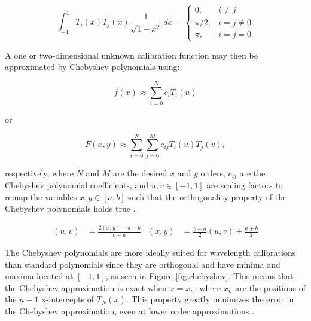 \begin{equation}
    \int_{-1}^{1} T_{i}(x) T_{j}(x) \frac{1}{\sqrt{1-x^{2}}} \,dx =
    \begin{cases}
        0,       & i \neq j     \\
        \pi / 2, & i = j \neq 0 \\
        \pi,     & i = j = 0
    \end{cases}
    \label{eq:chebyorth}
\end{equation}

A one or two-dimensional unknown calibration function may then be approximated by Chebyshev polynomials using:

\begin{equation}
    f(x) \approx \sum_{i = 0}^{N}  c_{i} T_{i}(u)
    \label{eq:chebyshev}
\end{equation}

\noindent or

\begin{equation}
    F(x, y) \approx \sum_{i = 0}^{N} \sum_{j = 0}^{M} c_{ij} T_{i}(u) T_{j}(v),
    \label{eq:chebyshev2D}
\end{equation}

\noindent respectively, where $N$ and $M$ are the desired $x$ and $y$ orders, $c_{ij}$ are the Chebyshev polynomial coefficients, and $u, v \in [-1, 1]$ are scaling factors to remap the variables $x, y \in [a, b]$ such that the orthogonality property of the Chebyshev polynomials holds true \citep{chebysurf, cheby2d}.

\begin{align}
    (u, v) & = \frac{2 (x, y) - a - b}{b - a} & (x, y) & = \frac{b - a}{2} (u, v) + \frac{a+b}{2}
    \label{eq:XtoUV}
\end{align}





The Chebyshev polynomials are more ideally suited for wavelength calibrations than standard polynomials since they are orthogonal and have minima and maxima located at $[-1, 1]$, as seen in Figure \ref{fig:chebyshev}. This means that the Chebyshev approximation is exact when $x = x_{n}$, where $x_{n}$ are the positions of the $n - 1$ x-intercepts of $T_{N}(x)$. This property greatly minimizes the error in the Chebyshev approximation, even at lower order approximations \citep{cheby}.

